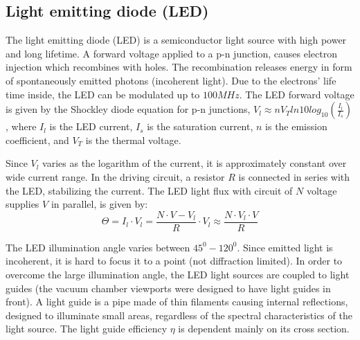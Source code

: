 \documentclass[\main/master.tex]{subfiles}
\begin{document}
\subsection{Light emitting diode (LED)}
The light emitting diode (LED) is a semiconductor light source with high power and long lifetime. A forward voltage applied to a p-n junction, causes electron injection which recombines with holes. The recombination releases energy in form of spontaneously emitted photons (incoherent light). Due to the electrons' life time inside, the LED can be modulated up to $100MHz$. The LED forward voltage is given by the Shockley diode equation for p-n junctions, $V_l \approx n V_T ln10 log_{10} (\frac{I_l}{I_s})$, where $I_l$ is the LED current, $I_s$ is the saturation current, $n$ is the emission coefficient, and $V_T$ is the thermal voltage. 
\par\noindent
Since $V_l$ varies as the logarithm of the current, it is approximately constant over wide current range. In the driving circuit, a resistor $R$ is connected in series with the LED, stabilizing the current. The LED light flux with circuit of $N$ voltage supplies $V$ in parallel, is given by:
\begin{equation}
\Theta = I_l\cdot V_l  =\frac{N\cdot V-V_l}{R}\cdot V_l\approx \frac{N\cdot V_l\cdot V}{R}\label{eqn:led power}
\end{equation}
\par\noindent
The LED illumination angle varies between $45^0-120^0$. Since emitted light is incoherent, it is hard to focus it to a point (not diffraction limited). In order to overcome the large illumination angle, the LED light sources are coupled to light guides (the vacuum chamber viewports were designed to have light guides in front). A light guide is a pipe made of thin filaments causing internal reflections, designed to illuminate small areas, regardless of the spectral characteristics of the light source. The light guide efficiency $\eta$ is dependent mainly on its cross section. 
\end{document}
